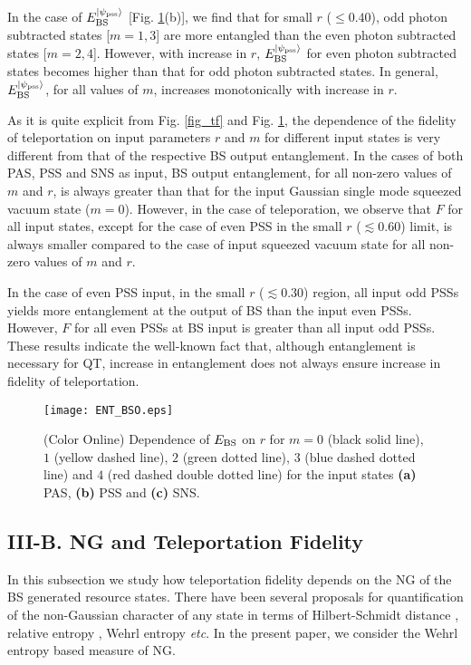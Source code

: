 \documentclass[letter,scriptaddress,twocolumn, prl,showkeys]{revtex4}
\begin{document}
In the case of $E_{\rm{BS}}^{|\psi_{\rm{pss}}\rangle}$ [Fig. \ref{fig_ent}(b)], we find that for small $r$ ($\leq 0.40$), odd photon subtracted states [$m=1,3$] are more entangled than the even photon subtracted states [$m=2,4$]. 
However, with increase in $r$, $E_{\rm{BS}}^{|\psi_{\rm{pss}}\rangle}$ for even photon subtracted states becomes higher than that for odd photon subtracted states. 
In general, $E_{\rm{BS}}^{|\psi_{\rm{pss}}\rangle}$, for all values of $m$, increases monotonically with increase in $r$. 

As it is quite explicit from Fig. \ref{fig_tf} and Fig. \ref{fig_ent}, the dependence of the fidelity of teleportation on input parameters $r$ and $m$ for different input states is very different from that of the respective BS output entanglement. 
In the cases of both PAS, PSS and SNS as input, BS output entanglement, for all non-zero values of $m$ and $r$, is always greater than that for the input Gaussian single mode squeezed vacuum state ($m=0$). 
However, in the case of teleporation, we observe that $F$ for all input states, except for the case of even PSS in the small $r$ ($\lesssim 0.60$) limit, is always smaller compared to the case of input squeezed vacuum state for all non-zero values of $m$ and $r$.

In the case of even PSS input, in the small $r$ ($\lesssim 0.30$) region, all input odd PSSs yields more entanglement at the output of BS than the input even PSSs.
However, $F$ for all even PSSs at BS input is greater than all input odd PSSs.
These results indicate the well-known fact that, although entanglement is necessary for QT, increase in entanglement does not always ensure increase in fidelity of teleportation.
\begin{figure}[h]
\texttt{[image: ENT\_BSO.eps]}
\caption{(Color Online) Dependence of $E_{\rm{BS}}$ on $r$ for $m=0$ (black solid line), $1$ (yellow dashed line), $2$ (green dotted line), $3$ (blue dashed dotted line) and $4$ (red dashed double dotted line) for the input states {\bf (a)} PAS, {\bf (b)} PSS and {\bf (c)} SNS. \label{fig_ent}}
\end{figure} 

\subsection*{III-B. NG and Teleportation Fidelity}

In this subsection we study how teleportation fidelity depends on the NG of the BS generated resource states.
There have been several proposals for quantification of the non-Gaussian character of any state in terms of Hilbert-Schmidt distance \cite{ngm_hsd}, relative entropy \cite{ngm_re}, Wehrl entropy \cite{ngm_we} \emph{etc}. In the present paper, we consider the Wehrl entropy based measure of NG. 
\end{document}

